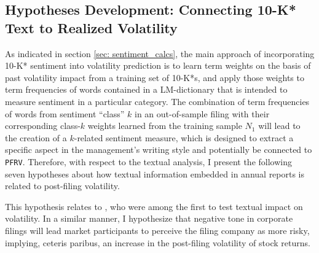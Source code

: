 \subsection{Hypotheses Development: Connecting 10-K* Text to Realized Volatility}
\label{ssec: volamodel_vola+senti}
As indicated in section \ref{sec: sentiment_calcs}, the main approach of incorporating 10-K* sentiment into volatility prediction is to learn term weights on the basis of past volatility impact from a training set of 10-K*s, and apply those weights to term frequencies of words contained in a LM-dictionary that is intended to measure sentiment in a particular category. The combination of term frequencies of words from sentiment \enquote{class} $k$ in an out-of-sample filing with their corresponding class-$k$ weights learned from the training sample $N_1$ will lead to the creation of a $k$-related sentiment measure, which is designed to extract a specific aspect in the management's writing style and potentially be connected to \texttt{PFRV}. Therefore, with respect to the textual analysis, I present the following seven hypotheses about how textual information embedded in annual reports is related to post-filing volatility.


This hypothesis relates to \textcite{KothariLiShort_2009}, who were among the first to test textual impact on volatility. In a similar manner, I hypothesize that negative tone in corporate filings will lead market participants to perceive the filing company as more risky, implying, ceteris paribus, an increase in the post-filing volatility of stock returns. 


